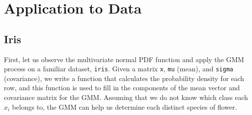 \documentclass[12pt]{article}
\newenvironment{Shaded}{\begin{snugshade}}{\end{snugshade}}
\newcommand{\AttributeTok}[1]{\textcolor[rgb]{0.13,0.29,0.53}{#1}}
\newcommand{\CommentTok}[1]{\textcolor[rgb]{0.56,0.35,0.01}{\textit{#1}}}
\newcommand{\ControlFlowTok}[1]{\textcolor[rgb]{0.13,0.29,0.53}{\textbf{#1}}}
\newcommand{\DecValTok}[1]{\textcolor[rgb]{0.00,0.00,0.81}{#1}}
\newcommand{\FunctionTok}[1]{\textcolor[rgb]{0.13,0.29,0.53}{\textbf{#1}}}
\newcommand{\NormalTok}[1]{#1}
\newcommand{\OtherTok}[1]{\textcolor[rgb]{0.56,0.35,0.01}{#1}}
\newcommand{\SpecialCharTok}[1]{\textcolor[rgb]{0.81,0.36,0.00}{\textbf{#1}}}
\newcommand{\StringTok}[1]{\textcolor[rgb]{0.31,0.60,0.02}{#1}}
\begin{document}
\hypertarget{application-to-data}{%
\section{Application to Data}\label{application-to-data}}

\hypertarget{iris}{%
\subsection{Iris}\label{iris}}

First, let us observe the multivariate normal PDF function and apply the
GMM process on a familiar dataset, \texttt{iris}. Given a matrix
\texttt{x}, \texttt{mu} (mean), and \texttt{sigma} (covariance), we
write a function that calculates the probability density for each row,
and this function is used to fill in the components of the mean vector
and covariance matrix for the GMM. Assuming that we do not know which
class each \(x_i\) belongs to, the GMM can help us determine each
distinct species of flower.

\begin{Shaded}
\end{Shaded}
\end{document}

